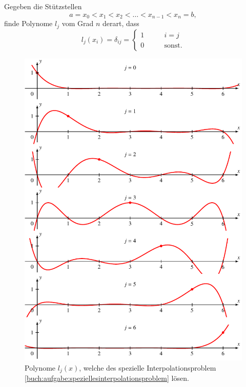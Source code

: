 \begin{aufgabe}
\label{buch:aufgabe:speziellesinterpolationsproblem}
Gegeben die Stützstellen
\[
a=x_0<x_1<x_2<\dots <x_{n-1}<x_n=b,
\]
finde Polynome $l_j$ vom Grad $n$ derart, dass
\[
l_j(x_i) = \delta_{ij}=\begin{cases}
1&\qquad i=j\\
0&\qquad\text{sonst.}
\end{cases}
\]
\end{aufgabe}

\begin{figure}
\centering
\includegraphics{chapters/30-interpolation/figures/basis.pdf}
\caption{Polynome $l_j(x)$, welche des spezielle Interpolationsproblem
\ref{buch:aufgabe:speziellesinterpolationsproblem}
lösen.
\label{buch:figure:spezielleinterpolation}}
\end{figure}

